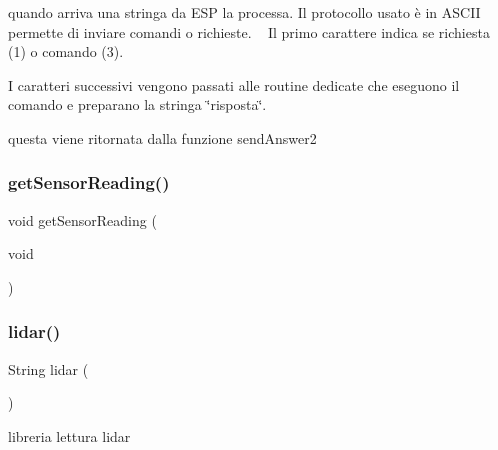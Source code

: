 quando arriva una stringa da E\+SP la processa. Il protocollo usato è in A\+S\+C\+II permette di inviare comandi o richieste. ~\newline
 Il primo carattere indica se richiesta (1) o comando (3). 

I caratteri successivi vengono passati alle routine dedicate che eseguono il comando e preparano la stringa \char`\"{}risposta\char`\"{}.

questa viene ritornata dalla funzione send\+Answer2 \mbox{\label{ari_pi__2_d_c__esp__08_8ino_a5b51c469eb312609df7a037c33bde58d}} 
\subsubsection{\texorpdfstring{get\+Sensor\+Reading()}{getSensorReading()}}
{\footnotesize\ttfamily void get\+Sensor\+Reading (\begin{DoxyParamCaption}\item[{void}]{ }\end{DoxyParamCaption})}

\mbox{\label{ari_pi__2_d_c__esp__08_8ino_a23abf4b5bc87f963b0270c015e379872}} 
\subsubsection{\texorpdfstring{lidar()}{lidar()}}
{\footnotesize\ttfamily String lidar (\begin{DoxyParamCaption}{ }\end{DoxyParamCaption})}



libreria lettura lidar 

\mbox{\label{ari_pi__2_d_c__esp__08_8ino_a0f6c65484953fd460fd89ee3a1a3825e}} 
